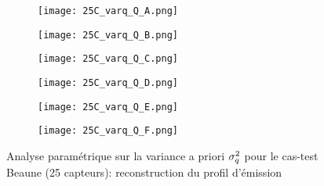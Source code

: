     \begin{figure}[p!]
    	\centering
    	\begin{subfigure}[t]{0.5\textwidth}
    		\centering
    		\texttt{[image: 25C\_varq\_Q\_A.png]}
    		\caption{}
    		\label{varq_A_q}
    	\end{subfigure}%
    	\begin{subfigure}[t]{0.5\textwidth}
    		\centering
    		\texttt{[image: 25C\_varq\_Q\_B.png]}
    		\caption{}
    		\label{varq_B_q}
    	\end{subfigure}
    	\begin{subfigure}[t]{0.5\textwidth}
    		\centering
    		\texttt{[image: 25C\_varq\_Q\_C.png]}
    		\caption{}
    		\label{varq_C_q}
    	\end{subfigure}%
    	\begin{subfigure}[t]{0.5\textwidth}
    		\centering
    		\texttt{[image: 25C\_varq\_Q\_D.png]}
    		\caption{}
    		\label{varq_D_q}
    	\end{subfigure}
    	\begin{subfigure}[t]{0.5\textwidth}
    		\centering
    		\texttt{[image: 25C\_varq\_Q\_E.png]}
    		\caption{}
    		\label{varq_E_q}
    	\end{subfigure}%
    	\begin{subfigure}[t]{0.5\textwidth}
    		\centering
    		\texttt{[image: 25C\_varq\_Q\_F.png]}
    		\caption{}
    		\label{varq_F_q}
    	\end{subfigure}
    	\caption{Analyse paramétrique sur la variance a priori $\sigma_q^2$ pour le cas-test Beaune (25 capteurs): reconstruction du profil d'émission}
    	\label{fig_25C_analyse_varq_q}
    \end{figure}